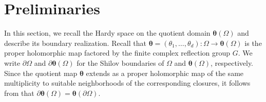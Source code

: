 \documentclass[12pt,reqno]{amsart}
\theoremstyle{remark}
\theoremstyle{definition}
\def \\theta{\boldsymbol{\theta}}
\def \\xi{\boldsymbol{\xi}}
\begin{document}





\section{Preliminaries}\label{S2}
In this section, we recall the Hardy space on the quotient domain $\boldsymbol \theta(\Omega)$ and describe its boundary realization. Recall that $\boldsymbol \theta=(\theta_1,\ldots, \theta_d):\Omega \to \boldsymbol \theta(\Omega)$ is the proper holomorphic map factored by the finite complex reflection group $G.$ We write $\partial\Omega$ and  $\partial\boldsymbol \theta(\Omega)$ for the Shilov boundaries of $\Omega$ and $\boldsymbol \theta(\Omega)$, respectively.
Since the quotient map $\boldsymbol\theta$ extends as a proper holomorphic map of the same multiplicity to suitable neighborhoods of the corresponding closures, it follows from \cite[p. 100, Corollary 3.2]{KZ2013} that $\partial\boldsymbol \theta(\Omega)=\boldsymbol \theta(\partial\Omega).$ 
\end{document}
